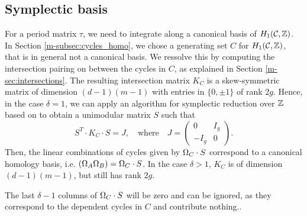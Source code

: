 \documentclass[main.tex]{subfiles}
\begin{document}

  \subsection{Symplectic basis}\label{subsec:symp_basis}

  For a period matrix $\tau$, we need to integrate along a canonical basis of $H_1(\mathcal{C},\mathbb{Z})$. In Section \ref{m-subsec:cycles_homo}, we chose a generating set $C$ for $H_1(\mathcal{C},\mathbb{Z})$, that is in general not
  a canonical basis. \abstand We
  ressolve this by computing the intersection pairing on between the cycles in $C$, as explained in Section \ref{m-sec:intersections}. The resulting intersection matrix $K_C$
   is a skew-symmetric matrix of dimension $(d-1)(m-1)$ with entries in $\{ 0,\pm 1\}$ of rank $2g$. Hence, in the case $\delta = 1$, we can apply an algorithm
  for symplectic reduction over $\mathbb{Z}$ based on
    \cite[Theorem 18]{KB2002} to obtain a unimodular matrix $S$ such that
  $$S^T \cdot K_C \cdot S = J, \quad \text{where} \quad J = \begin{pmatrix} 0 & I_g \\ -I_g & 0 \end{pmatrix}.$$
  Then, the linear combinations of cycles given by $\Omega_C \cdot S$ correspond to a canonical homology basis, i.e. $(  \Omega_A  \Omega_B  ) = \Omega_C \cdot S$.
  In the case $\delta > 1$, $K_C$ is of dimension $(d-1)(m-1)$, but still has rank $2g$.

  The last $\delta-1$ columns of $\Omega_C \cdot S$ will be zero and can be ignored, as they correspond to the dependent cycles
  in $C$ and contribute nothing..


\biblio
\end{document}
